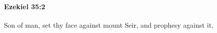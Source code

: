 
		\paragraph{Ezekiel 35:2} %
			\label{EZEKIEL-35-2}

			Son of man, set thy face against mount Seir, and prophesy against it,


